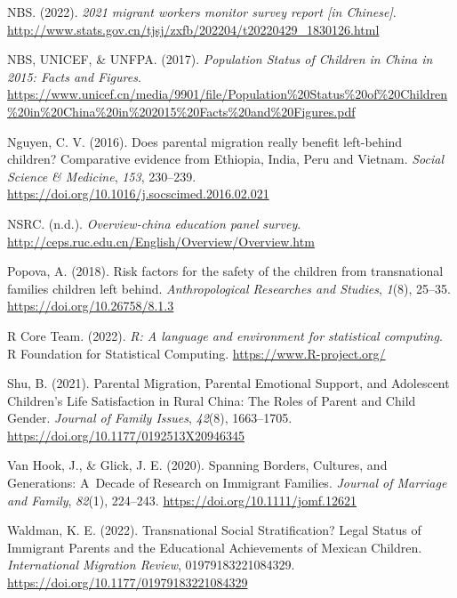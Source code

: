 \documentclass[
  man,floatsintext]{apa7}
\newlength{\cslhangindent}
\newlength{\cslentryspacingunit} %
\newenvironment{CSLReferences}[2] %
 {%
  \setlength{\parindent}{0pt}
  \ifodd #1
  \let\oldpar\par
  \def\par{\hangindent=\cslhangindent\oldpar}
  \fi
  \setlength{\parskip}{#2\cslentryspacingunit}
 }%
 {}
\begin{document}
\begin{CSLReferences}{1}{0}
\leavevmode{}%
NBS. (2022). \emph{2021 migrant workers monitor survey report {[}in Chinese{]}}. \url{http://www.stats.gov.cn/tjsj/zxfb/202204/t20220429_1830126.html}

\leavevmode{}%
NBS, UNICEF, \& UNFPA. (2017). \emph{Population Status of Children in China in 2015: Facts and Figures}. \url{https://www.unicef.cn/media/9901/file/Population\%20Status\%20of\%20Children\%20in\%20China\%20in\%202015\%20Facts\%20and\%20Figures.pdf}

\leavevmode{}%
Nguyen, C. V. (2016). Does parental migration really benefit left-behind children? Comparative evidence from Ethiopia, India, Peru and Vietnam. \emph{Social Science \& Medicine}, \emph{153}, 230--239. \url{https://doi.org/10.1016/j.socscimed.2016.02.021}

\leavevmode{}%
NSRC. (n.d.). \emph{Overview-china education panel survey}. \url{http://ceps.ruc.edu.cn/English/Overview/Overview.htm}

\leavevmode{}%
Popova, A. (2018). Risk factors for the safety of the children from transnational families children left behind. \emph{Anthropological Researches and Studies}, \emph{1}(8), 25--35. \url{https://doi.org/10.26758/8.1.3}

\leavevmode{}%
R Core Team. (2022). \emph{R: A language and environment for statistical computing}. R Foundation for Statistical Computing. \url{https://www.R-project.org/}

\leavevmode{}%
Shu, B. (2021). Parental Migration, Parental Emotional Support, and Adolescent Children{'}s Life Satisfaction in Rural China: The Roles of Parent and Child Gender. \emph{Journal of Family Issues}, \emph{42}(8), 1663--1705. \url{https://doi.org/10.1177/0192513X20946345}

\leavevmode{}%
Van Hook, J., \& Glick, J. E. (2020). Spanning Borders, Cultures, and Generations: A~Decade of Research on Immigrant Families. \emph{Journal of Marriage and Family}, \emph{82}(1), 224--243. \url{https://doi.org/10.1111/jomf.12621}

\leavevmode{}%
Waldman, K. E. (2022). Transnational Social Stratification? Legal Status of Immigrant Parents and the Educational Achievements of Mexican Children. \emph{International Migration Review}, 01979183221084329. \url{https://doi.org/10.1177/01979183221084329}


\end{CSLReferences}
\end{document}

